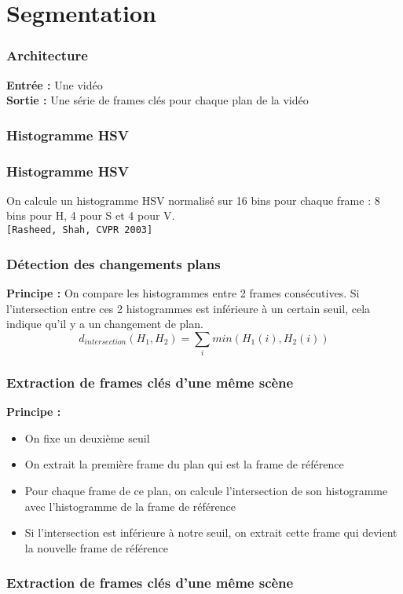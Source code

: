  \section{Segmentation}
 
 \begin{frame}
 \frametitle{Architecture}
 \textbf{Entrée :}  Une vidéo \\ 
 
 \textbf{Sortie :}  Une série de frames clés pour chaque plan de la vidéo \\
 
 \end{frame}

 \begin{frame}
 \frametitle{Histogramme HSV}
 \end{frame}
 
 \begin{frame}
 \frametitle{Histogramme HSV}
 On calcule un histogramme HSV normalisé sur 16 bins pour chaque frame : 8 bins pour H, 4 pour S et 4 pour V.\\
 \vspace{1cm}
 \verb![Rasheed, Shah, CVPR 2003]!\\
 \end{frame}
 
 \begin{frame}
 \frametitle{Détection des changements plans}
 
 \textbf{Principe :} On compare les histogrammes entre 2 frames consécutives. Si l'intersection entre ces 2 histogrammes est inférieure à un certain seuil, cela indique qu'il y a un changement de plan. \\
 \[d_{intersection}(H_{1},H_{2}) = \sum_{i} min(H_{1}(i),H_{2}(i))\]
 
 \end{frame}
 
 
 \begin{frame}
 \frametitle{Extraction de frames clés d'une même scène}
 \textbf{Principe :}
\begin{itemize} 
\item{On fixe un deuxième seuil}
\item{On extrait la première frame du plan qui est la frame de référence}
\item{Pour chaque frame de ce plan, on calcule l'intersection de son histogramme avec l'histogramme de la frame de référence}
\item{Si l'intersection est inférieure à notre seuil, on extrait cette frame qui devient la nouvelle frame de référence}
\end{itemize}
\end{frame}

\begin{frame}
 \frametitle{Extraction de frames clés d'une même scène}
\end{frame}